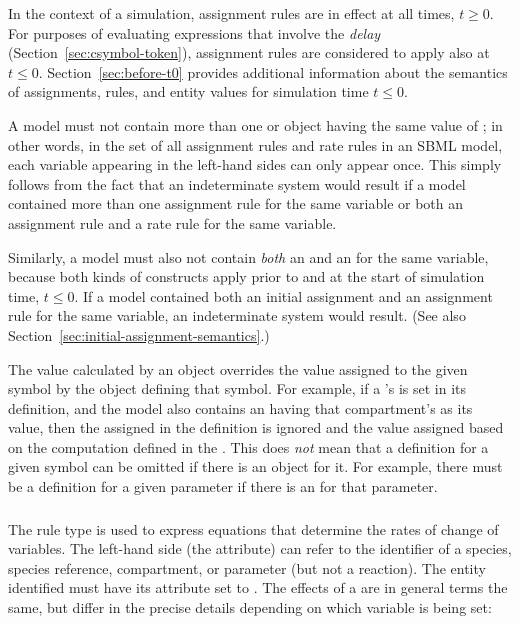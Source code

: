 In the context of a simulation, assignment rules are in effect at
all times, $t \geq 0$.  For purposes of evaluating expressions
that involve the \emph{delay} 
(Section~\ref{sec:csymbol-token}), assignment rules are considered
to apply also at $t \leq 0$.  Section~\ref{sec:before-t0} provides
additional information about the semantics of assignments, rules,
and entity values for simulation time $t \leq 0$.

A model must not contain more than one \AssignmentRule or
\RateRule object having the same value of ; in
other words, in the set of all assignment rules and rate rules in
an SBML model, each variable appearing in the left-hand sides can
only appear once.  This simply follows from the fact that an
indeterminate system would result if a model contained more than
one assignment rule for the same variable or both an assignment
rule and a rate rule for the same variable.

Similarly, a model must also not contain \emph{both} an
\AssignmentRule and an \InitialAssignment for the same variable,
because both kinds of constructs apply prior to and at the start
of simulation time, \ie $t \leq 0$.  If a model contained both an
initial assignment and an assignment rule for the same variable,
an indeterminate system would result.  (See also
Section~\ref{sec:initial-assignment-semantics}.)

The value calculated by an \AssignmentRule object overrides the
value assigned to the given symbol by the object defining that
symbol.  For example, if a \Compartment's  is set in
its definition, and the model also contains an \AssignmentRule
having that compartment's  as its 
value, then the  assigned in the \Compartment
definition is ignored and the value assigned based on the
computation defined in the \AssignmentRule.  This does \emph{not}
mean that a definition for a given symbol can be omitted if there
is an \AssignmentRule object for it.  For example, there must be a
\Parameter definition for a given parameter if there is an
\AssignmentRule for that parameter.


\subsubsection{}
\label{sec:raterule}

The rule type \RateRule is used to express equations that
determine the rates of change of variables.  The left-hand side
(the  attribute) can refer to the identifier of a
species, species reference, compartment, or parameter (but not a 
reaction).  The
entity identified must have its  attribute set to
.  The effects of a \RateRule are in general terms the
same, but differ in the precise details depending on which
variable is being set:

